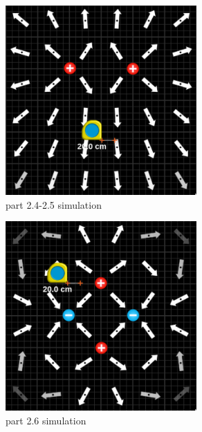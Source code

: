 \documentclass{article}
\begin{document}
\begin{figure}[H]
	\begin{center}
		\includegraphics[width=0.65\textwidth]{part-2.4-2.5-simulation} %
		\caption{part 2.4-2.5 simulation}
	\end{center}
\end{figure}

\begin{figure}[H]
	\begin{center}
		\includegraphics[width=0.65\textwidth]{part-2.5-simulation} %
		\caption{part 2.6 simulation}
	\end{center}
\end{figure}
\end{document}
